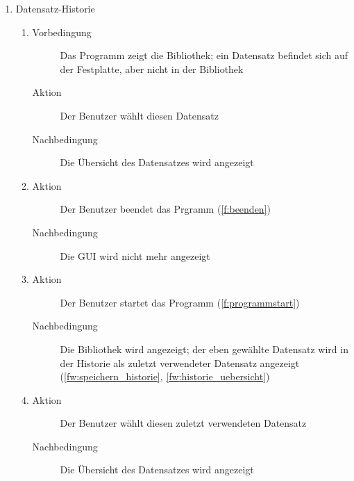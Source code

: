 \begin{enumerate} [label=\bfseries /TSW \arabic*0/, leftmargin=*]
	\item Datensatz-Historie \label{ts:historie}
	\begin{enumerate}[leftmargin=0pt]
		\item
		\begin{description}
			\item[Vorbedingung] Das Programm zeigt die Bibliothek; ein Datensatz befindet sich auf der Festplatte, aber nicht in der Bibliothek
			\item[Aktion] Der Benutzer wählt diesen Datensatz
			\item[Nachbedingung] Die Übersicht des Datensatzes wird angezeigt
		\end{description}
		\item
		\begin{description}
			\item[Aktion] Der Benutzer beendet das Prgramm (\ref{f:beenden})
			\item[Nachbedingung] Die \gls{GUI} wird nicht mehr angezeigt
		\end{description}
		\item
		\begin{description}
			\item[Aktion] Der Benutzer startet das Programm (\ref{f:programmstart})
			\item[Nachbedingung] Die Bibliothek wird angezeigt; der eben gewählte Datensatz wird in der Historie als zuletzt verwendeter Datensatz angezeigt (\ref{fw:speichern_historie}, \ref{fw:historie_uebersicht})
		\end{description}
		\item
		\begin{description}
			\item[Aktion] Der Benutzer wählt diesen zuletzt verwendeten Datensatz
			\item[Nachbedingung] Die Übersicht des Datensatzes wird angezeigt
		\end{description}
	\end{enumerate}


\end{enumerate}
